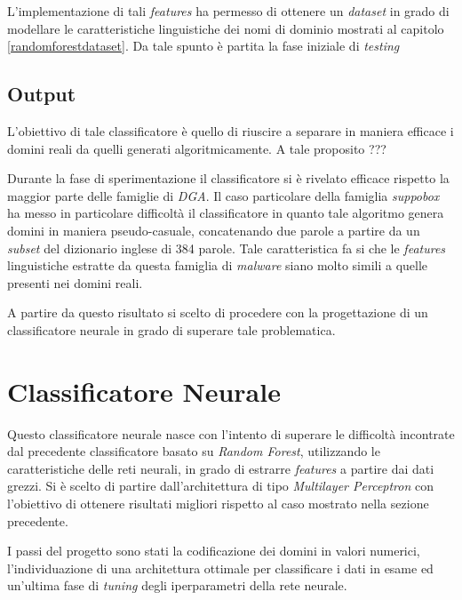 L'implementazione di tali \textit{features} ha permesso di ottenere un \textit{dataset} in grado di modellare le caratteristiche linguistiche dei nomi di dominio mostrati al capitolo \ref{randomforestdataset}. Da tale spunto è partita la fase iniziale di \textit{testing} 

\subsection{Output}
\label{randomforestoutput}
L'obiettivo di tale classificatore è quello di riuscire a separare in maniera efficace i domini reali da quelli generati algoritmicamente. A tale proposito ???

Durante la fase di sperimentazione il classificatore si è rivelato efficace rispetto la maggior parte delle famiglie di \textit{DGA}. Il caso particolare della famiglia \textit{suppobox} \cite{geffner2013end} ha messo in particolare difficoltà il classificatore in quanto tale algoritmo genera domini in maniera pseudo-casuale, concatenando due parole a partire da un \textit{subset} del dizionario inglese di 384 parole. Tale caratteristica fa si che le \textit{features} linguistiche estratte da questa famiglia di \textit{malware} siano molto simili a quelle presenti nei domini reali.



A partire da questo risultato si scelto di procedere con la progettazione di un classificatore neurale in grado di superare tale problematica.


\section{Classificatore Neurale}
\label{classificatorenn}
Questo classificatore neurale nasce con l'intento di superare le difficoltà incontrate dal precedente classificatore basato su \textit{Random Forest}, utilizzando le caratteristiche delle reti neurali, in grado di estrarre \textit{features} a partire dai dati grezzi. Si è scelto di partire dall'architettura di tipo \textit{Multilayer Perceptron} con l'obiettivo di ottenere risultati migliori rispetto al caso mostrato nella sezione precedente.

I passi del progetto sono stati la codificazione dei domini in valori numerici, l'individuazione di una architettura ottimale per classificare i dati in esame ed un'ultima fase di \textit{tuning} degli iperparametri della rete neurale. 

